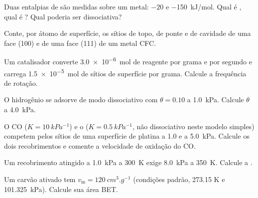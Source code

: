 \begin{exercise}[$\star$]\label{exo:b3:surfaces-catalysis:2}
Duas entalpias de  são medidas sobre um metal: $-20$ e \qty{-150}{kJ/mol}. Qual
é , qual é ? Qual poderia ser dissociativa?
\end{exercise}

\begin{exercise}[$\star$]\label{exo:b3:surfaces-catalysis:3}
Conte, por átomo de superfície, os sítios de topo, de ponte e de cavidade de uma
face (100) e de uma face (111) de um metal CFC.
\end{exercise}

\begin{exercise}[$\star$]\label{exo:b3:surfaces-catalysis:4}
Um catalisador converte \qty{3.0e-6}{mol} de reagente por grama e por segundo e
carrega \qty{1.5e-5}{mol} de sítios de superfície por grama. Calcule a frequência de rotação.
\end{exercise}

\begin{exercise}[$\star\star$]\label{exo:b3:surfaces-catalysis:5}
O hidrogênio se adsorve de modo dissociativo com $\theta = 0.10$ a \qty{1.0}{kPa}. Calcule $\theta$ a \qty{4.0}{kPa}.
\end{exercise}

\begin{exercise}[$\star\star$]\label{exo:b3:surfaces-catalysis:6}
O CO ($K = \qty{10}{kPa^{-1}}$) e o  ($K = \qty{0.5}{kPa^{-1}}$, não dissociativo neste modelo simples)
competem pelos sítios de uma superfície de platina a 1.0 e a \qty{5.0}{kPa}. Calcule os
dois recobrimentos e comente a velocidade de oxidação do CO.
\end{exercise}

\begin{exercise}[$\star\star$]\label{exo:b3:surfaces-catalysis:7}
Um recobrimento atingido a \qty{1.0}{kPa} a \qty{300}{K} exige \qty{8.0}{kPa} a \qty{350}{K}.
Calcule a .
\end{exercise}

\begin{exercise}[$\star\star$]\label{exo:b3:surfaces-catalysis:8}
Um carvão ativado tem $v_{\mathrm m} = \qty{120}{cm^3.g^{-1}}$ (condições padrão, 273.15 K e
\qty{101.325}{kPa}). Calcule sua área BET.
\end{exercise}

